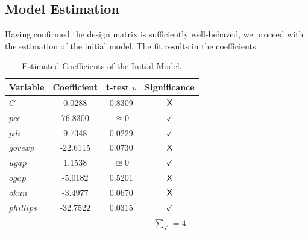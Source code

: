 \subsection{Model Estimation}\label{subsec:model_estimation}

Having confirmed the design matrix is sufficiently well-behaved, we proceed with the estimation of the initial model.
The fit results in the coefficients:
\begin{table}[H]
    \centering
    \begin{tabular}{lccc}
        \toprule
        \textbf{Variable} & \textbf{Coefficient} & \textbf{t-test $p$} & \textbf{Significance} \\
        \midrule
        $C$ & 0.0288 & 0.8309 & $\text{\sffamily{X}}$ \\ 
        $pce$ & 76.8300 & $\approxeq 0$ & $\checkmark$ \\
        $pdi$ & 9.7348 & 0.0229 & $\checkmark$ \\
        $govexp$ & -22.6115 & 0.0730 & $\text{\sffamily{X}}$ \\
        $ugap$ & 1.1538 & $\approxeq 0$ & $\checkmark$ \\
        $ogap$ & -5.0182 & 0.5201 & $\text{\sffamily{X}}$ \\
        $okun$ &  -3.4977 & 0.0670 & $\text{\sffamily{X}}$ \\
        $phillips$ & -32.7522 & 0.0315 & $\checkmark$ \\
        \midrule
        & & & $\sum_\checkmark = 4$ \\
        \bottomrule
    \end{tabular}
    \caption{Estimated Coefficients of the Initial Model.}
    \label{tab:estimated_coefficients}
\end{table}

